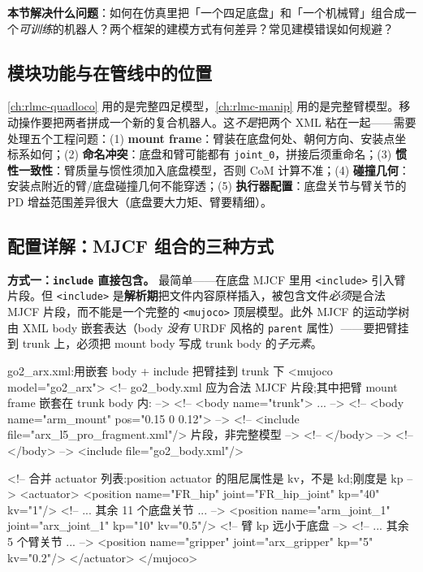 \textbf{本节解决什么问题}：如何在仿真里把「一个四足底盘」和「一个机械臂」组合成一个\emph{可训练}的机器人？两个框架的建模方式有何差异？常见建模错误如何规避？

\subsection{模块功能与在管线中的位置}
\label{sec:rlmc-lm-asset-role}

\cref{ch:rlmc-quadloco} 用的是完整四足模型，\cref{ch:rlmc-manip} 用的是完整臂模型。移动操作要把两者拼成一个新的复合机器人。这\emph{不是}把两个 XML 粘在一起——需要处理五个工程问题：(1) \textbf{mount frame}：臂装在底盘何处、朝何方向、安装点坐标系如何；(2) \textbf{命名冲突}：底盘和臂可能都有 \verb|joint_0|，拼接后须重命名；(3) \textbf{惯性一致性}：臂质量与惯性须加入底盘模型，否则 CoM 计算不准；(4) \textbf{碰撞几何}：安装点附近的臂/底盘碰撞几何不能穿透；(5) \textbf{执行器配置}：底盘关节与臂关节的 PD 增益范围差异很大（底盘要大力矩、臂要精细）。

\subsection{配置详解：MJCF 组合的三种方式}
\label{sec:rlmc-lm-mjcf}

\textbf{方式一：\texttt{include} 直接包含。} 最简单——在底盘 MJCF 里用 \verb|<include>| 引入臂片段。但 \verb|<include>| 是\textbf{解析期}把文件内容原样插入，被包含文件\emph{必须}是合法 MJCF 片段，而不能是一个完整的 \verb|<mujoco>| 顶层模型。此外 MJCF 的运动学树由 XML body 嵌套表达（body \emph{没有} URDF 风格的 \verb|parent| 属性）——要把臂挂到 trunk 上，必须把 mount body 写成 trunk body 的\emph{子元素}。

\begin{codebox}[text]{go2\_arx.xml:用嵌套 body + include 把臂挂到 trunk 下}
<mujoco model="go2_arx">
  <!-- go2_body.xml 应为合法 MJCF 片段;其中把臂 mount frame 嵌套在 trunk body 内: -->
  <!--   <body name="trunk"> ...                                              -->
  <!--     <body name="arm_mount" pos="0.15 0 0.12">                          -->
  <!--       <include file="arx_l5_pro_fragment.xml"/>   片段，非完整模型      -->
  <!--     </body>                                                            -->
  <!--   </body>                                                             -->
  <include file="go2_body.xml"/>

  <!-- 合并 actuator 列表:position actuator 的阻尼属性是 kv，不是 kd;刚度是 kp -->
  <actuator>
    <position name="FR_hip" joint="FR_hip_joint" kp="40" kv="1"/>
    <!-- ... 其余 11 个底盘关节 ... -->
    <position name="arm_joint_1" joint="arx_joint_1" kp="10" kv="0.5"/>  <!-- 臂 kp 远小于底盘 -->
    <!-- ... 其余 5 个臂关节 ... -->
    <position name="gripper" joint="arx_gripper" kp="5" kv="0.2"/>
  </actuator>
</mujoco>
\end{codebox}

